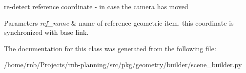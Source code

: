 re-\/detect reference coordinate -\/ in case the camera has moved 


\begin{DoxyParams}{Parameters}
{\em ref\+\_\+name} & name of reference geometric item. this coordinate is synchronized with base link. \\
\hline
\end{DoxyParams}


The documentation for this class was generated from the following file\+:\begin{DoxyCompactItemize}
\item 
/home/rnb/\+Projects/rnb-\/planning/src/pkg/geometry/builder/scene\+\_\+builder.\+py\end{DoxyCompactItemize}
